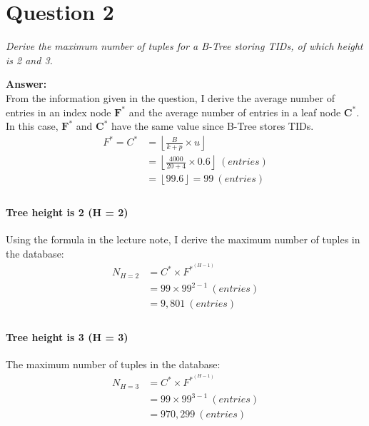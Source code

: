 \documentclass[a4paper,12pt]{article}
\begin{document}
\vfill
\pagebreak

\section*{Question 2}

\textit{Derive the maximum number of tuples for a B-Tree storing TIDs, of which height is 2 and 3.} 

\noindent
\textbf{Answer:} \\
From the information given in the question, I derive the average number of entries in an index node $\boldsymbol{F}^{\boldsymbol{*}}$ and the average number of entries in a leaf node $\boldsymbol{C}^{\boldsymbol{*}}$. In this case, $\boldsymbol{F}^{\boldsymbol{*}}$ and $\boldsymbol{C}^{\boldsymbol{*}}$ have the same value since B-Tree stores TIDs.
\begin{equation*}
    \begin{aligned}
        F^{*} = C^{*} &= \left \lfloor {\frac{B}{k + p} \times u } \right \rfloor \\
        & = \left \lfloor {\frac{4000}{20 + 4} \times 0.6} \right \rfloor \ (entries) \\
        & = \left \lfloor {99.6} \right \rfloor = 99 \ (entries) \\
    \end{aligned}
\end{equation*}

\paragraph{Tree height is 2 (H = 2)} Using the formula in the lecture note, I derive the maximum number of tuples in the database: 
\begin{equation*}
    \begin{aligned}
        N_{H=2} &=  C^{*} \times F^{*}^{(H-1)}   \\
        & = 99 \times 99^{2-1} \ (entries) \\ 
        & = 9,801 \ (entries) \\
    \end{aligned}
\end{equation*}

\paragraph{Tree height is 3 (H = 3)} The maximum number of tuples in the database: 
\begin{equation*}
    \begin{aligned}
        N_{H=3} &=  C^{*} \times F^{*}^{(H-1)}   \\
        & = 99 \times 99^{3-1} \ (entries) \\ 
        & = 970,299 \ (entries) \\
    \end{aligned}
\end{equation*}
\end{document}
